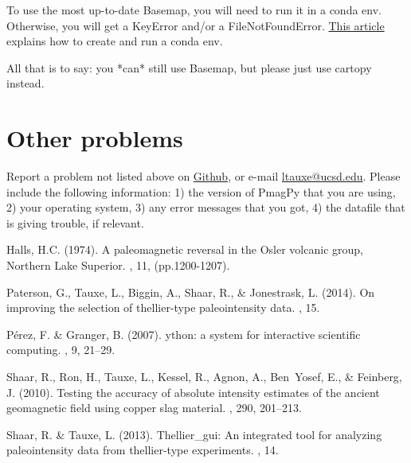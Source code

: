 \documentclass[11pt]{book}
\begin{document}
{{To use the most up-to-date Basemap, you will need to run it in a conda env.  Otherwise, you will get a KeyError and/or a FileNotFoundError.  \href{https://medium.com/data-science-in-practice/saving-the-environment-with-anaconda-ad68e603d8c5}{This article} explains how to create and run a conda env.

All that is to say: you *can* still use Basemap, but please just use cartopy instead.

\section{Other problems}Report a problem not listed above on \href{https://github.com/PmagPy/PmagPy/issues/new}{Github}, or e-mail \href{mailto:ltauxe@ucsd.edu}{ltauxe@ucsd.edu}. Please include the following information: 1) the version of PmagPy that you are using, 2) your operating system, 3) any error messages that you got, 4) the datafile that is giving trouble, if relevant.



\begin{thebibliography}{}


Halls, H.C. (1974).
\newblock A paleomagnetic reversal in the Osler volcanic group, Northern Lake Superior.
, 11, (pp.1200-1207).


Paterson, G., Tauxe, L., Biggin, A., Shaar, R., \& Jonestrask, L. (2014).
\newblock On improving the selection of thellier-type paleointensity data.
, 15.

P\'{e}rez, F. \& Granger, B. (2007).
ython: a system for interactive scientific computing.
, 9, 21--29.


Shaar, R., Ron, H., Tauxe, L., Kessel, R., Agnon, A., Ben~Yosef, E., \&
  Feinberg, J. (2010).
\newblock Testing the accuracy of absolute intensity estimates of the ancient
  geomagnetic field using copper slag material.
, 290, 201--213.

Shaar, R. \& Tauxe, L. (2013).
\newblock Thellier\_gui: An integrated tool for analyzing paleointensity data
  from thellier-type experiments.
, 14.


\end{thebibliography}}}
\end{document}
